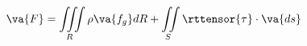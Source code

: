 \begin{equation}
  \va{F} = \iiint\limits_R\rho\va{f_g} dR + \iint\limits_S\rttensor{\tau}\cdot\va{ds}
\end{equation}

